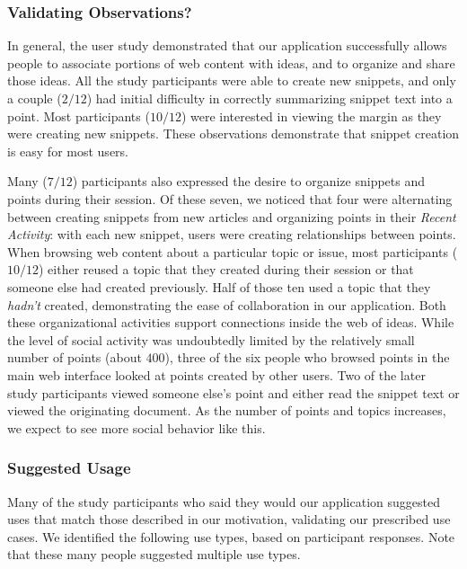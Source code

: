 \documentclass{sig-alt-release2}
\begin{document}

\subsubsection{Validating Observations?}
In general, the user study demonstrated that our application successfully allows people to associate portions of web content with ideas, and to organize and share those ideas. All the study participants were able to create new snippets, and only a couple ($2/12$) had initial difficulty in correctly summarizing snippet text into a point. Most participants ($10/12$) were interested in viewing the margin as they were creating new snippets. These observations demonstrate that snippet creation is easy for most users.

Many ($7/12$) participants also expressed the desire to organize snippets and points during their session. Of these seven, we noticed that four were alternating between creating snippets from new articles and organizing points in their {\it Recent Activity}: with each new snippet, users were creating relationships between points. When browsing web content about a particular topic or issue, most participants ($10/12$) either reused a topic that they created during their session or that someone else had created previously. Half of those ten used a topic that they {\it hadn't} created, demonstrating the ease of collaboration in our application. Both these organizational activities support connections inside the web of ideas. While the level of social activity was undoubtedly limited by the relatively small number of points (about $400$), three of the six people who browsed points in the main web interface looked at points created by other users. Two of the later study participants viewed someone else's point and either read the snippet text or viewed the originating document. As the number of points and topics increases, we expect to see more social behavior like this.


\subsubsection{Suggested Usage}
Many of the study participants who said they would our application suggested uses that match those described in our motivation, validating our prescribed use cases.  We identified the following use types, based on participant responses. Note that these many people suggested multiple use types.
\end{document}
